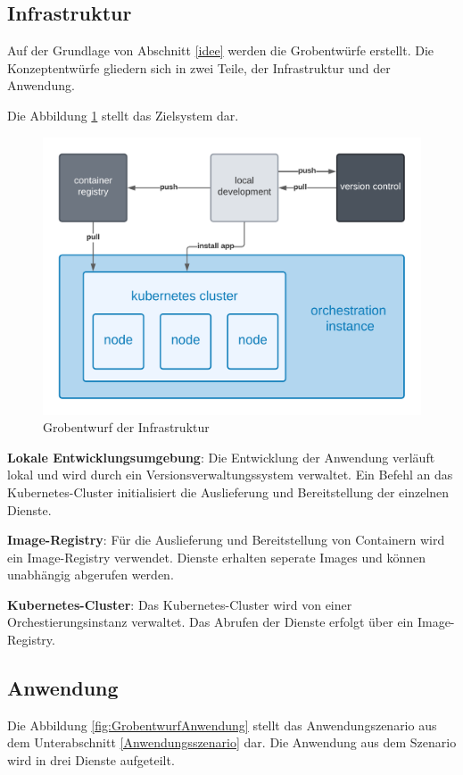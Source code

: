 \newpage

\subsection{Infrastruktur}
Auf der Grundlage von Abschnitt \ref{idee} werden die Grobentwürfe erstellt.
Die Konzeptentwürfe gliedern sich in zwei Teile, der Infrastruktur und der Anwendung.

Die Abbildung \ref{fig:GrobentwurfInfrastruktur} stellt das Zielsystem dar.
\begin{figure}[!htb]
  \centering
  \includegraphics[width=0.8\columnwidth]{images/GrobentwurfInfrastruktur.png}
  \caption{Grobentwurf der Infrastruktur}
  \label{fig:GrobentwurfInfrastruktur}
\end{figure}

\textbf{Lokale Entwicklungsumgebung}: Die Entwicklung der Anwendung verläuft lokal und wird durch ein Versionsverwaltungssystem verwaltet.
Ein Befehl an das Kubernetes-Cluster initialisiert die Auslieferung und Bereitstellung der einzelnen Dienste. 

\textbf{Image-Registry}: Für die Auslieferung und Bereitstellung von Containern wird ein Image-Registry verwendet.
Dienste erhalten seperate Images und können unabhängig abgerufen werden.

\textbf{Kubernetes-Cluster}: Das Kubernetes-Cluster wird von einer Orchestierungsinstanz verwaltet.
Das Abrufen der Dienste erfolgt über ein Image-Registry.





\subsection{Anwendung}
Die Abbildung \ref{fig:GrobentwurfAnwendung} stellt das Anwendungszenario aus dem Unterabschnitt \ref{Anwendungsszenario} dar.
Die Anwendung aus dem Szenario wird in drei Dienste aufgeteilt.


